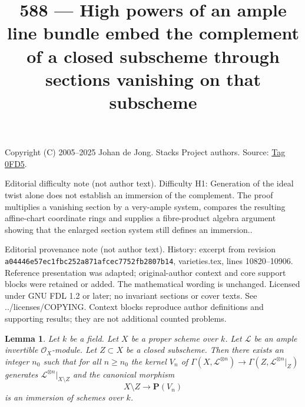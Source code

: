 \documentclass{amsart}
\theoremstyle{plain}
\newtheorem{lemma}[subsection]{Lemma}
\theoremstyle{definition}
\theoremstyle{remark}
\numberwithin{equation}{subsection}
\begin{document}
\title[Stacks Project, Tag 0FD5]{588 --- High powers of an ample line bundle embed the complement of a closed subscheme through sections vanishing on that subscheme}
\maketitle
\noindent Copyright (C) 2005--2025 Johan de Jong. Stacks Project authors. Source: \href{https://stacks.math.columbia.edu/tag/0FD5}{Tag 0FD5}.

\noindent Editorial difficulty note (not author text). Difficulty H1: Generation of the ideal twist alone does not establish an immersion of the complement. The proof multiplies a vanishing section by a very-ample system, compares the resulting affine-chart coordinate rings and supplies a fibre-product algebra argument showing that the enlarged section system still defines an immersion..

\noindent Editorial provenance note (not author text). History: excerpt from revision \texttt{a0444\allowbreak 6e57e\allowbreak c1fbc\allowbreak 252a8\allowbreak 71afc\allowbreak ec775\allowbreak 2fb28\allowbreak 07b14}, varieties.tex, lines 10820--10906. Reference presentation was adapted; original-author context and core support blocks were retained or added. The mathematical wording is unchanged. Licensed under GNU FDL 1.2 or later; no invariant sections or cover texts. See ../licenses/COPYING. Context blocks reproduce author definitions and supporting results; they are not additional counted problems.

\begin{lemma}
\label{lemma-generate-over-complement}
Let $k$ be a field. Let $X$ be a proper scheme over $k$. Let $\mathcal{L}$
be an ample invertible $\mathcal{O}_X$-module. Let $Z \subset X$ be a
closed subscheme. Then there exists an integer $n_0$ such that for all
$n \geq n_0$ the kernel $V_n$ of
$\Gamma(X, \mathcal{L}^{\otimes n}) \to \Gamma(Z, \mathcal{L}^{\otimes n}|_Z)$
generates $\mathcal{L}^{\otimes n}|_{X \setminus Z}$ and
the canonical morphism
$$
X \setminus Z \longrightarrow \mathbf{P}(V_n)
$$
is an immersion of schemes over $k$.
\end{lemma}
\end{document}
